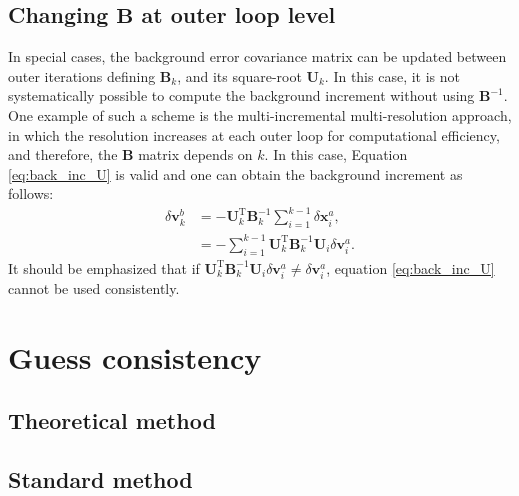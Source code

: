 \documentclass[npg, manuscript]{copernicus}
\begin{document}
\subsection{Changing $\mathbf{B}$ at outer loop level}
In special cases, the background error covariance matrix can be updated between outer iterations defining $\mathbf{B}_k$, and its square-root $\mathbf{U}_k$. In this case, it is not systematically possible to compute the background increment without using $\mathbf{B}^{-1}$. One example of such a scheme is the multi-incremental multi-resolution approach, in which the resolution increases at each outer loop for computational efficiency, and therefore, the $\mathbf{B}$ matrix depends on $k$. In this case, Equation \eqref{eq:back_inc_U} is valid and one can obtain the background increment as follows:
\begin{align}
\label{eq:back_inc_U_diff}
\delta \mathbf{v}^b_k & = - \mathbf{U}_k^\mathrm{T} \mathbf{B}_k^{-1} \sum_{i=1}^{k-1} \delta \mathbf{x}^a_i, \nonumber \\
& = - \sum_{i=1}^{k-1} \mathbf{U}_k^\mathrm{T} \mathbf{B}_k^{-1} \mathbf{U}_i \delta \mathbf{v}^a_i.
\end{align}
It should be emphasized that if $\mathbf{U}_k^\mathrm{T} \mathbf{B}_k^{-1} \mathbf{U}_i \delta \mathbf{v}^a_i \ne \delta \mathbf{v}^a_i$, equation \eqref{eq:back_inc_U} cannot be used consistently.




\section{Guess consistency}

\subsection{Theoretical method}

\subsection{Standard method}
\end{document}
